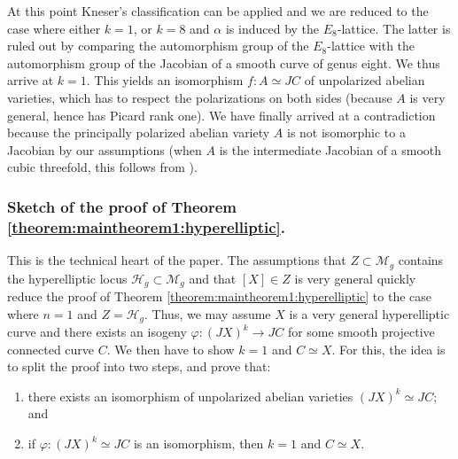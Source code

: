 \documentclass[a4paper,11pt,reqno]{amsart}
\numberwithin{equation}{section}
\theoremstyle{plain}
\theoremstyle{definition}
\newcommand{\ca}[1]{{\mathcal{#1}}}
\renewcommand{\cong}{\simeq}
\begin{document}
At this point Kneser's classification can be applied and we are reduced to the case where either $k=1$, or $k=8$ and $\alpha$ is induced by the $E_8$-lattice.
The latter is ruled out by comparing the automorphism group of the $E_8$-lattice with the automorphism group of the Jacobian of a smooth curve of genus eight. 
We thus arrive at $k=1$. 
This yields an isomorphism $f \colon A\cong JC$ of unpolarized abelian varieties, which has to respect the polarizations on both sides (because $A$ is very general, hence has Picard rank one). 
We have finally arrived at a contradiction because the principally polarized abelian variety $A$ is not isomorphic to a Jacobian by our assumptions (when $A$ is the intermediate Jacobian of a smooth cubic threefold, this follows from \cite{clemensgriffiths-cubicthreefold}).

\subsubsection{Sketch of the proof of Theorem \ref{theorem:maintheorem1:hyperelliptic}.} 
This is the technical heart of the paper.  
The assumptions that $Z\subset \mathcal M_g$ contains the hyperelliptic locus $\ca H_g \subset \ca M_g$ and that $[X]\in Z$ is very general 
quickly reduce the proof of Theorem \ref{theorem:maintheorem1:hyperelliptic} to the case where $n=1$ and $Z = \ca H_g$. 
Thus, we may assume $X$ is a very general hyperelliptic curve and there exists an isogeny $\varphi \colon (JX)^k \to JC$ for some smooth projective connected curve $C$.
We then have to show $k=1$ and $C\cong X$. For this, the idea is to split the proof into two steps, and prove that:
\begin{enumerate} [label=(\roman*)]
\item there exists an isomorphism of unpolarized abelian varieties $(JX)^k \cong JC$; and\label{item:(i)}
\item  if $\varphi \colon (JX)^k \cong JC$ is an isomorphism, then $k = 1$ and $C \cong X$. \label{item:(ii)}
\end{enumerate}
\end{document}

